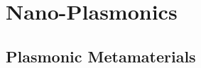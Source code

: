 \chapter{Nano-Plasmonics}\label{sec:background:Plasmonics}

\section{Plasmonic Metamaterials}\label{sec:background:Plasmonics:Nanostructures}